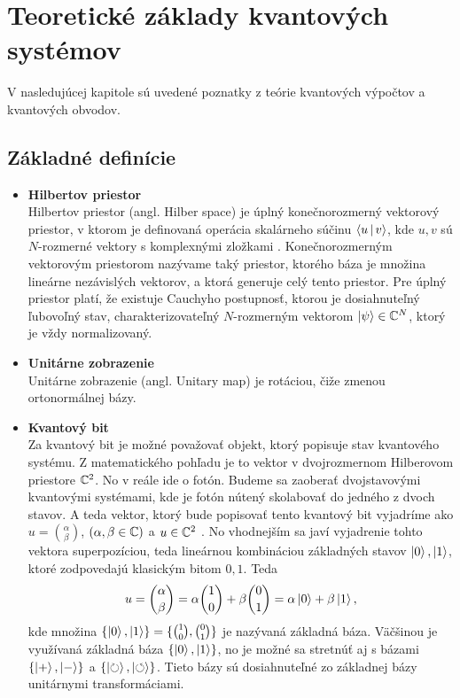
\chapter{Teoretické základy kvantových systémov}

V nasledujúcej kapitole sú uvedené poznatky z teórie kvantových výpočtov a kvantových obvodov.

\section{Základné definície}

\begin{itemize}
\item[] \textbf{Hilbertov priestor} \\
\label{hil_space}
Hilbertov priestor (angl. Hilber space) je úplný konečnorozmerný vektorový priestor, v ktorom je definovaná operácia skalárneho súčinu \(\Braket{u|v}\), kde \(u,v\) sú \(N\)-rozmerné vektory s komplexnými zložkami \cite{Nie10}.
Konečnorozmerným vektorovým priestorom nazývame taký priestor, ktorého báza je množina lineárne nezávislých  vektorov, a ktorá generuje celý tento priestor.
Pre úplný priestor platí, že existuje Cauchyho postupnosť, ktorou je dosiahnuteľný ľubovoľný stav, charakterizovateľný \(N\)-rozmerným vektorom \(\Ket{\psi} \in \mathbb{C}^{N}\), ktorý je vždy normalizovaný.

\item[] \textbf{Unitárne zobrazenie} \\
Unitárne zobrazenie (angl. Unitary map) je rotáciou, čiže zmenou ortonormálnej bázy.

\item[] \textbf{Kvantový bit} \\
Za kvantový bit je možné považovať objekt, ktorý popisuje stav kvantového systému.
Z matematického pohľadu je to vektor v dvojrozmernom Hilberovom priestore \(\mathbb{C}^{2}\).
No v reále ide o fotón.
Budeme sa zaoberať dvojstavovými kvantovými systémami, kde je fotón nútený skolabovať do jedného z dvoch stavov.
A teda vektor, ktorý bude popisovať tento kvantový bit vyjadríme ako \(u = \binom{\alpha}{\beta}\), \( ( \alpha, \beta \in \mathbb{C} ) \) a \(u \in \mathbb{C}^{2}\) \cite{Kay07}.
No vhodnejším sa javí vyjadrenie tohto vektora superpozíciou, teda lineárnou kombináciou základných stavov \(\Ket{0}, \Ket{1}\), ktoré zodpovedajú klasickým bitom \(0,1\).
Teda \[u = \binom{\alpha}{\beta} = \alpha \binom{1}{0} + \beta \binom{0}{1} = \alpha\Ket{0} + \beta\Ket{1},\]
kde množina \(\{\Ket{0}, \Ket{1}\} = \{\binom{1}{0}, \binom{0}{1}\}\) je nazývaná základná báza.
Väčšinou je využívaná základná báza \(\{\Ket{0}, \Ket{1}\}\), no je možné sa stretnúť aj s bázami \(\{\Ket{+}, \Ket{-}\}\) a \(\{\Ket{\circlearrowright}, \Ket{\circlearrowleft}\}\). Tieto bázy sú dosiahnuteľné zo základnej bázy unitárnymi transformáciami.


\end{itemize}
